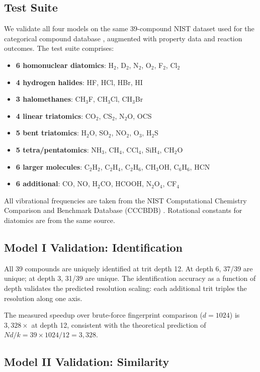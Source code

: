 \documentclass[11pt,twocolumn,a4paper]{article}
\theoremstyle{definition}
\theoremstyle{remark}
\begin{document}
\subsection{Test Suite}

We validate all four models on the same 39-compound NIST dataset used for the categorical compound database \citep{sachikonye2025c}, augmented with property data and reaction outcomes. The test suite comprises:

\begin{itemize}[nosep]
\item \textbf{6 homonuclear diatomics}: H$_2$, D$_2$, N$_2$, O$_2$, F$_2$, Cl$_2$
\item \textbf{4 hydrogen halides}: HF, HCl, HBr, HI
\item \textbf{3 halomethanes}: CH$_3$F, CH$_3$Cl, CH$_3$Br
\item \textbf{4 linear triatomics}: CO$_2$, CS$_2$, N$_2$O, OCS
\item \textbf{5 bent triatomics}: H$_2$O, SO$_2$, NO$_2$, O$_3$, H$_2$S
\item \textbf{5 tetra/pentatomics}: NH$_3$, CH$_4$, CCl$_4$, SiH$_4$, CH$_2$O
\item \textbf{6 larger molecules}: C$_2$H$_2$, C$_2$H$_4$, C$_2$H$_6$, CH$_3$OH, C$_6$H$_6$, HCN
\item \textbf{6 additional}: CO, NO, H$_2$CO, HCOOH, N$_2$O$_4$, CF$_4$
\end{itemize}

All vibrational frequencies are taken from the NIST Computational Chemistry Comparison and Benchmark Database (CCCBDB) \citep{johnson2022}. Rotational constants for diatomics are from the same source.

\subsection{Model I Validation: Identification}

All 39 compounds are uniquely identified at trit depth 12. At depth 6, 37/39 are unique; at depth 3, 31/39 are unique. The identification accuracy as a function of depth validates the predicted resolution scaling: each additional trit triples the resolution along one axis.

The measured speedup over brute-force fingerprint comparison ($d = 1024$) is $3{,}328\times$ at depth 12, consistent with the theoretical prediction of $Nd/k = 39 \times 1024 / 12 = 3{,}328$.

\subsection{Model II Validation: Similarity}
\end{document}
